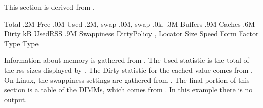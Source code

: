 \documentclass[letterpaper,10pt,english]{sphinxmanual}
\begin{document}
This section is derived from .

\begin{sphinxVerbatim}[commandchars=\\\{\}]
       Total  .2M
        Free  .0M
        Used    .2M, swap   .0M,
               swap   .0k,   .3M
     Buffers  .9M
      Caches  .6M
       Dirty   kB
     UsedRSS  .9M
  Swappiness  
 DirtyPolicy  , 
 Locator  Size  Speed    Form Factor  Type    Type 
               
\end{sphinxVerbatim}

Information about memory is gathered from . The Used statistic is the
total of the rss sizes displayed by . The Dirty statistic for the cached
value comes from . On Linux, the swappiness settings are
gathered from . The final portion of this section is a table of the
DIMMs, which comes from . In this example there is no output.
\end{document}
